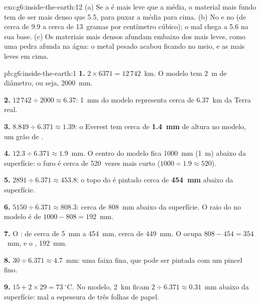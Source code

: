 \begin{solution}{exo:g6:inside-the-earth:12}
(a) Se a  é mais leve que a média, o material mais fundo tem de ser
mais denso que 5.5, para puxar a média para cima. (b) No  e
no  (de cerca de 9.9 a cerca de 13~gramas por centímetro
cúbico); o  mal chega a 5.6 na sua base. (c) Os materiais mais densos
afundam embaixo dos mais leves, como uma pedra afunda na água: o metal
pesado acabou ficando no meio, e as  mais leves em cima.
\end{solution}

\begin{solution}{pb:g6:inside-the-earth:1}
\textbf{1.} $2 \times 6371 = 12\,742$~km. O modelo tem 2~m de diâmetro, ou
seja, 2000~mm.

\textbf{2.} $12\,742 \div 2000 \approx 6.37$: 1~mm do modelo representa
cerca de 6.37~km da Terra real.

\textbf{3.} $8.849 \div 6.371 \approx 1.39$: o Everest tem cerca de
\textbf{1.4~mm} de altura no modelo, um grão de .

\textbf{4.} $12.3 \div 6.371 \approx 1.9$~mm. O centro do modelo fica
1000~mm (1~m) abaixo da superfície: o furo é cerca de 520~vezes mais curto
($1000 \div 1.9 \approx 520$).

\textbf{5.} $2891 \div 6.371 \approx 453.8$: o topo do  é
pintado cerca de \textbf{454~mm} abaixo da superfície.

\textbf{6.} $5150 \div 6.371 \approx 808.3$: cerca de 808~mm abaixo da
superfície. O raio do  no modelo é de $1000 - 808 = 192$~mm.

\textbf{7.} O : de cerca de 5~mm a 454~mm, cerca de 449~mm. O  ocupa $808 - 454 = 354$~mm, e o , 192~mm.

\textbf{8.} $30 \div 6.371 \approx 4.7$~mm: uma faixa fina, que pode ser
pintada com um pincel fino.

\textbf{9.} $15 + 2 \times 29 = 73~^\circ$C. No modelo, 2~km ficam
$2 \div 6.371 \approx 0.31$~mm abaixo da superfície: mal a espessura de
três folhas de papel.


\end{solution}
